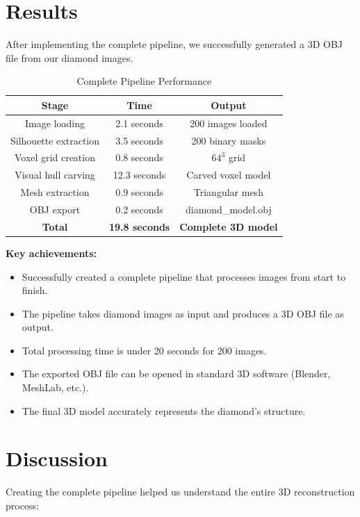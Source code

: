 \documentclass[a4paper,12pt]{article}
\begin{document}
\section{Results}

After implementing the complete pipeline, we successfully generated a 3D OBJ file from our diamond images.

\begin{table}[h!]
\centering
\caption{Complete Pipeline Performance}
\begin{tabular}{|c|c|c|}
\hline
\textbf{Stage} & \textbf{Time} & \textbf{Output} \\
\hline
Image loading & 2.1 seconds & 200 images loaded \\
Silhouette extraction & 3.5 seconds & 200 binary masks \\
Voxel grid creation & 0.8 seconds & $64^3$ grid \\
Visual hull carving & 12.3 seconds & Carved voxel model \\
Mesh extraction & 0.9 seconds & Triangular mesh \\
OBJ export & 0.2 seconds & diamond\_model.obj \\
\hline
\textbf{Total} & \textbf{19.8 seconds} & \textbf{Complete 3D model} \\
\hline
\end{tabular}
\label{tab:pipeline}
\end{table}

\textbf{Key achievements:}

\begin{itemize}
    \item Successfully created a complete pipeline that processes images from start to finish.
    \item The pipeline takes diamond images as input and produces a 3D OBJ file as output.
    \item Total processing time is under 20 seconds for 200 images.
    \item The exported OBJ file can be opened in standard 3D software (Blender, MeshLab, etc.).
    \item The final 3D model accurately represents the diamond's structure.
\end{itemize}

\section{Discussion}

Creating the complete pipeline helped us understand the entire 3D reconstruction process:
\end{document}

